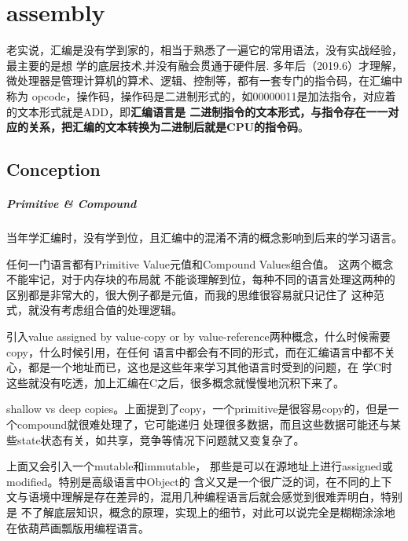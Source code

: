 \chapter{assembly}
老实说，汇编是没有学到家的，相当于熟悉了一遍它的常用语法，没有实战经验，最主要的是想
学的底层技术,并没有融会贯通于硬件层.
\newline
多年后（2019.6）才理解，微处理器是管理计算机的算术、逻辑、控制等，都有一套专门的指令码，在汇编中称为
opcode，操作码，操作码是二进制形式的，如00000011是加法指令，对应着的文本形式就是ADD，即\textbf{汇编语言是
二进制指令的文本形式，与指令存在一一对应的关系，把汇编的文本转换为二进制后就是CPU的指令码}。

\section{Conception}

\paragraph{Primitive \& Compound}

当年学汇编时，没有学到位，且汇编中的混淆不清的概念影响到后来的学习语言。

任何一门语言都有Primitive Value元值和Compound Values组合值。 这两个概念不能牢记，对于内存块的布局就
不能谈理解到位，每种不同的语言处理这两种的区别都是非常大的，很大例子都是元值，而我的思维很容易就只记住了
这种范式，就没有考虑组合值的处理逻辑。

引入value assigned by value-copy or by value-reference两种概念，什么时候需要copy，什么时候引用，在任何
语言中都会有不同的形式，而在汇编语言中都不关心，都是一个地址而已，这也是这些年来学习其他语言时受到的问题，在
学C时这些就没有吃透，加上汇编在C之后，很多概念就慢慢地沉积下来了。

shallow vs deep copies。上面提到了copy，一个primitive是很容易copy的，但是一个compound就很难处理了，它可能递归
处理很多数据，而且这些数据可能还与某些state状态有关，如共享，竞争等情况下问题就又变复杂了。

上面又会引入一个mutable和immutable， 那些是可以在源地址上进行assigned或modified。特别是高级语言中Object的
含义又是一个很广泛的词，在不同的上下文与语境中理解是存在差异的，混用几种编程语言后就会感觉到很难弄明白，特别是
不了解底层知识，概念的原理，实现上的细节，对此可以说完全是糊糊涂涂地在依葫芦画瓢版用编程语言。

